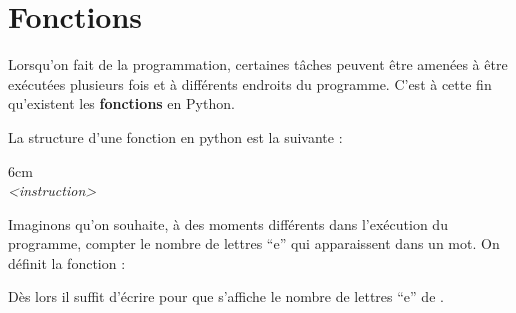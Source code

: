 \section{Fonctions}

Lorsqu'on fait de la programmation, certaines tâches peuvent être amenées à être exécutées plusieurs fois et à différents endroits du programme. C'est à cette fin qu'existent les \textbf{fonctions} en Python.

La structure d'une fonction en python est la suivante :

\begin{center}
\begin{encadre}{6cm}
 \comp{:} \\ 
\hspace*{7mm} {\it <instruction>}\\ 
\hspace*{7.5mm} 
\end{encadre}
\end{center}

\bigskip
\begin{exemple}
Imaginons qu'on souhaite, à des moments différents dans l'exécution du programme, compter le nombre de lettres ``e'' qui apparaissent dans un mot. On définit la fonction :
\begin{center}
\end{center}

\vspace{-1mm}
Dès lors il suffit d'écrire  pour que s'affiche le nombre de lettres ``e'' de .
\end{exemple}





